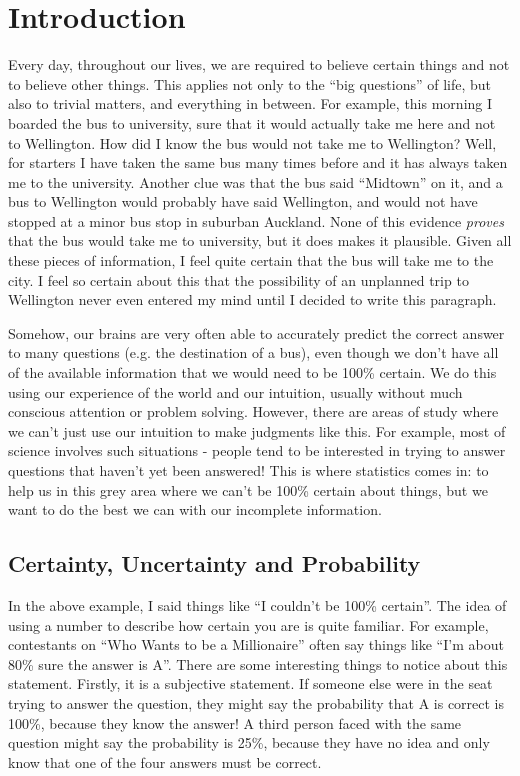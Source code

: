 \chapter{Introduction}
Every day, throughout our lives, we are required 
to believe certain things and not to believe other things. This applies not
only to the ``big questions'' of life, but also to trivial matters, and 
everything in between. For example, this morning I boarded the bus to 
university, sure that it would actually take me here and not to Wellington.
How did I know the bus would not take me to Wellington? Well, for starters
I have taken the same bus many times before and it has always taken me to the
university. Another clue was that the bus said ``Midtown'' on it, and a bus
to Wellington would probably have said Wellington, and would not have stopped
at a minor bus stop in suburban Auckland.
None of this evidence {\it proves} that the bus would take me to university,
but it does makes it plausible. Given all these pieces of information, I feel
quite certain that the bus will take me to the city. I feel so certain
about this that the possibility of an
unplanned trip to Wellington never even entered my mind until I decided to
write this paragraph.

Somehow, our brains are very often able to accurately predict the correct answer
to many questions (e.g. the destination of a bus), even though we don't have
all of the available information that we would need to be 100\% certain.
We do this using our experience of the world and our intuition, usually 
without much conscious attention or problem solving. However, there are areas
of study where we can't just use our intuition to make judgments like this.
For example, most of science involves such situations - people tend to be
interested in trying to answer questions that haven't yet been answered!
This is where statistics comes in: to help us in this grey area where we can't
be 100\% certain about things, but we want to do the best we can with our
incomplete information.

\section{Certainty, Uncertainty and Probability}
In the above example, I said things like ``I couldn't be 100\% certain''. The
idea of using a number to describe how certain you are is quite familiar.
For example, contestants on ``Who Wants to be a Millionaire'' often say things
like ``I'm about 80\% sure the answer is A''. There are some interesting
things to notice about this statement. Firstly, it is a subjective statement.
If someone else were in the seat trying to answer the question, they might say
the probability that A is correct is 100\%, because they know the answer!
A third person faced with the same question might say the probability is 25\%,
because they have no idea and only know that one of the four answers
must be correct.

